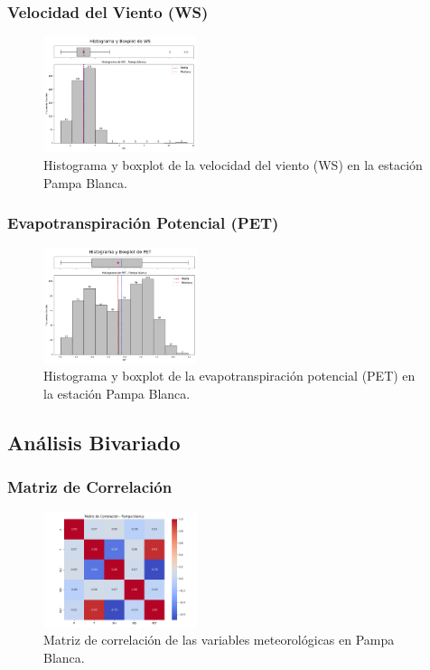 \subsubsection*{Velocidad del Viento (WS)}
\begin{figure}[H]
\centering
\includegraphics[width=0.4\textwidth]{resultados/por_estacion_meteorologica/Pampa_Blanca/WS_histograma.png}
\caption{Histograma y boxplot de la velocidad del viento (WS) en la estación Pampa Blanca.}
\label{fig:pampablanca_WS}
\end{figure}

\subsubsection*{Evapotranspiración Potencial (PET)}
\begin{figure}[H]
\centering
\includegraphics[width=0.4\textwidth]{resultados/por_estacion_meteorologica/Pampa_Blanca/PET_histograma.png}
\caption{Histograma y boxplot de la evapotranspiración potencial (PET) en la estación Pampa Blanca.}
\label{fig:pampablanca_PET}
\end{figure}

\subsection{Análisis Bivariado}

\subsubsection*{Matriz de Correlación}
\begin{figure}[H]
\centering
\includegraphics[width=0.4\textwidth]{resultados/por_estacion_meteorologica/Pampa_Blanca/matriz_correlacion.png}
\caption{Matriz de correlación de las variables meteorológicas en Pampa Blanca.}
\label{fig:pampablanca_corr}
\end{figure}

